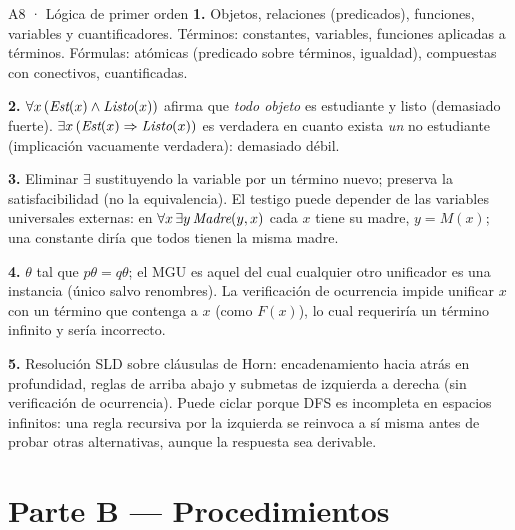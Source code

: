 \begin{solucion}{A8 · Lógica de primer orden}
\textbf{1.} Objetos, relaciones (predicados), funciones, variables y cuantificadores. Términos:
constantes, variables, funciones aplicadas a términos. Fórmulas: atómicas (predicado sobre términos,
igualdad), compuestas con conectivos, cuantificadas.

\textbf{2.} $\forall x\,(\textit{Est}(x)\wedge\textit{Listo}(x))$ afirma que \emph{todo objeto} es estudiante y
listo (demasiado fuerte). $\exists x\,(\textit{Est}(x)\Rightarrow\textit{Listo}(x))$ es verdadera en cuanto exista
\emph{un} no estudiante (implicación vacuamente verdadera): demasiado débil.

\textbf{3.} Eliminar $\exists$ sustituyendo la variable por un término nuevo; preserva la
satisfacibilidad (no la equivalencia). El testigo puede depender de las variables universales
externas: en $\forall x\,\exists y\,\textit{Madre}(y,x)$ cada $x$ tiene su madre, $y=M(x)$; una constante
diría que todos tienen la misma madre.

\textbf{4.} $\theta$ tal que $p\theta=q\theta$; el MGU es aquel del cual cualquier otro unificador es una
instancia (único salvo renombres). La verificación de ocurrencia impide unificar $x$ con un término
que contenga a $x$ (como $F(x)$), lo cual requeriría un término infinito y sería incorrecto.

\textbf{5.} Resolución SLD sobre cláusulas de Horn: encadenamiento hacia atrás en profundidad, reglas
de arriba abajo y submetas de izquierda a derecha (sin verificación de ocurrencia). Puede ciclar
porque DFS es incompleta en espacios infinitos: una regla recursiva por la izquierda se reinvoca a sí
misma antes de probar otras alternativas, aunque la respuesta sea derivable.
\end{solucion}

\newpage
\section{Parte B — Procedimientos}

